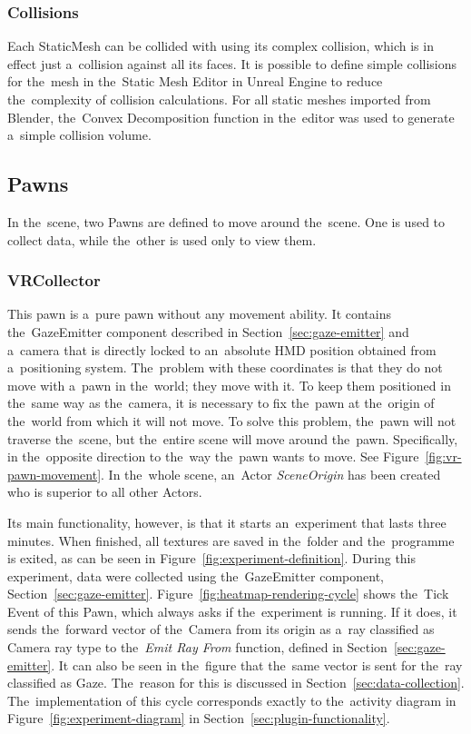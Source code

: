 \subsubsection*{Collisions}
Each StaticMesh can be collided with using its complex collision, which is in effect just a~collision against all its faces. It is possible to define simple collisions for the~mesh in the~Static Mesh Editor in Unreal Engine to reduce the~complexity of collision calculations. For all static meshes imported from Blender, the~Convex Decomposition function in the~editor was used to generate a~simple collision volume. 

\pagebreak{}

\subsection{Pawns}
\label{sec:pawns}
In the~scene, two Pawns are defined to move around the~scene. One is used to collect data, while the~other is used only to view them. 

\subsubsection*{VRCollector}
This pawn is a~pure pawn without any movement ability. It contains the~GazeEmitter component described in Section~\ref{sec:gaze-emitter} and a~camera that is directly locked to an~absolute HMD position obtained from a~positioning system. The~problem with these coordinates is that they do not move with a~pawn in the~world; they move with it. To keep them positioned in the~same way as the~camera, it is necessary to fix the~pawn at the~origin of the~world from which it will not move. To solve this problem, the~pawn will not traverse the~scene, but the~entire scene will move around the~pawn. Specifically, in the~opposite direction to the~way the~pawn wants to move. See Figure~\ref{fig:vr-pawn-movement}. In the~whole scene, an~Actor \emph{SceneOrigin} has been created who is superior to all other Actors. 


Its main functionality, however, is that it starts an~experiment that lasts three minutes. When finished, all textures are saved in the~folder  and the~programme is exited, as can be seen in Figure~\ref{fig:experiment-definition}. During this experiment, data were collected using the~GazeEmitter component, Section~\ref{sec:gaze-emitter}. Figure~\ref{fig:heatmap-rendering-cycle} shows the~Tick Event of this Pawn, which always asks if the~experiment is running. If it does, it sends the~forward vector of the~Camera from its origin as a~ray classified as Camera ray type to the~\emph{Emit Ray From} function, defined in Section~\ref{sec:gaze-emitter}. It can also be seen in the~figure that the~same vector is sent for the~ray classified as Gaze. The~reason for this is discussed in Section~\ref{sec:data-collection}. The~implementation of this cycle corresponds exactly to the~activity diagram in Figure~\ref{fig:experiment-diagram} in Section~\ref{sec:plugin-functionality}.

